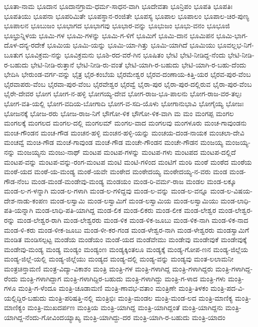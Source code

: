{ಭೂತಾ-ನಾಮ
ಭೂದಾನ
ಭೂದಾನಗ್ರಾಮ-ಧರ್ಮ-ಸಾಧನ-ವಾಗಿ
ಭೂದೇವತಾ
ಭೂನ್ರಿಪಂ
ಭೂಪತಿ
ಭೂಪತಿಃ
ಭೂಪತಿಯು
ಭೂಪನಾ
ಭೂಪರಿಮಿತೇ
ಭೂಪಸ್ಥಾನ-ರಂಜಿತೇ
ಭೂಪಸ್ಯ
ಭೂಪಾಲ
ಭೂಪಾಲಂ
ಭೂಪಾಲ-ಚಿರ-ಪುಣ್ಯ
ಭೂಪಾಲನ
ಭೂಬುಜಂ
ಭೂಭಾಗದ
ಭೂಭಾಗವು
ಭೂಭಾರ-ವನ್ನು
ಭೂಭುಜಂ
ಭೂಭು-ವನಂ
ಭೂಭೂಜಿ
ಭೂಭ್ರುನ್ನಿಳಯ
ಭೂಮಿ-ಗಳ
ಭೂಮಿ-ಗಳನ್ನು
ಭೂಮಿ-ಗ-ಳಿಗೆ
ಭೂಮಿಗೆ
ಭೂಮಿ-ದಾನ
ಭೂಮಿಪನ
ಭೂಮಿ-ಭಾಗ-ದೊಳ-ದನ್ಯ-ರದೇಕೆ
ಭೂಮಿಯ
ಭೂಮಿ-ಯನ್ನು
ಭೂಮಿ-ಯಾ-ಗಿತ್ತು
ಭೂಮಿ-ಯಾಗಿದೆ
ಭೂಮಿಯು
ಭೂವಲ್ಲಭ-ನಿಗೆ-ಬೂತುಗ
ಭೂವಿಕ್ರಮ-ನನ್ನು
ಭೂವಿಕ್ರಮನು
ಭೂಶಿ-ರದ-ವರೆ-ಗಿನ
ಭೂಷಿತಂ
ಭೇಟಿ
ಭೇಟಿ-ನೀಡಿದ್ದ-ನೆಂದು
ಭೇಟಿ-ನೀಡಿ-ರ-ಬಹುದು
ಭೇಟಿ-ನೀಡಿ-ರುತ್ತಾನೆ
ಭೇಟಿ-ನೀಡಿ-ರು-ವಂತೆ
ಭೇಟಿ-ಯಾಗಿ-ರ-ಬಹುದು
ಭೇಟಿ-ಯಾಗಿ-ರ-ಬಹು-ದೆಂದು
ಭೇದಿಸಿ
ಭೇರುಂಡ-ವರ್ಗ-ವನ್ನು
ಭೈತ್ರ
ಭೈರ-ಕಂಬೆಯ
ಭೈರಮೇಶ್ವರ
ಭೈರವ-ದಂಣಾಯ-ಕಿತ್ತಿ-ಯರ
ಭೈರವ-ಪುರ-ವೆಂಬ
ಭೈರವಾಪರು-ವೆಂಬ
ಭೈರವಾ-ಪುರ-ವೆಂಬ
ಭೈರವೇಶ್ವರ
ಭೈರವ್ವೆ
ಭೈರಾ-ಪುರ
ಭೈರಾ-ಪುರ-ದಲ್ಲಿರುವ
ಭೈರಾ-ಪುರ-ವೆಂಬ
ಭೈರೇ-ದೇವರ
ಭೋಗ
ಭೋಗ-ನ-ಹಳ್ಳಿ
ಭೋಗಯ್ಯ-ದೇವ
ಭೋಗ-ರಾಜ-ಭೂ-ಪಾಲನು
ಭೋಗ-ರಾಜ-ವರ-ತಲ್ಪಃ
ಭೋಗ-ವತಿ-ಯಲ್ಲಿ
ಭೋಗ-ವದಿಯ-ಬೋಗಾದಿ
ಭೋಗ-ವ-ಸದಿ-ಯೊಳು
ಭೋಗಾನುಭಾವಿ
ಭೋಗೈಯ್ಯ
ಭೋಜಃ
ಭೋಜನಕ್ಕೆ
ಭೋಜ-ರರು
ಭೋಜ-ರಾಜ-ನಿಗೆ
ಭೌಗೋ-ಳಿಕ
ಭೌಗೋ-ಳಿಕ-ವಾಗಿ
ಮ
ಮಂ
ಮಂಗಪ್ಪ
ಮಂಗಲ
ಮಂಗಲಕ್ಕೆ
ಮಂಗಲದ
ಮಂಗಲ-ದಲ್ಲಿ
ಮಂಗಲಮ್
ಮಂಗಲ-ವಾದ
ಮಂಗಲವು
ಮಂಗಳೂರು
ಮಂಚ-ಗಾವುಂಡನು
ಮಂಚ-ಗೌಂಡನ
ಮಂಚ-ಗೌಡ
ಮಂಚನ-ಹಳ್ಳಿ
ಮಂಚನ-ಹಳ್ಳಿ-ಯನ್ನು
ಮಂಚಯ-ದಂಡ-ನಾಯಕ
ಮಂಚಲಾ-ದೇವಿ
ಮಂಚವ್ವೆ
ಮಂಚಿ-ಗೌಡ
ಮಂಚೆ-ಗಾವುಂಡ
ಮಂಚೆ-ಗೌಡ
ಮಂಚೇ-ಗೌಂಡನ
ಮಂಚೇ-ಗೌಡನ
ಮಂಜಯ್ಯ
ಮಂಜಯ್ಯ-ನನ್ನು
ಮಂಜಯ್ಯನು
ಮಂಜು-ನಾಥ್
ಮಂಟಪ
ಮಂಟಪ-ಗಳನ್ನು
ಮಂಟಪ-ಗಳು
ಮಂಟಪದ
ಮಂಟಪ-ದಲ್ಲಿದೆ
ಮಂಟಪ-ವನ್ನು
ಮಂಟಪ-ವನ್ನು-ರಂಗ-ಮಂಟಪ
ಮಂಟಿ
ಮಂಟಿ-ಗಳಿಂದ
ಮಂಟಿಗೆ
ಮಂಠಿ
ಮಂಠೆ
ಮಂಠೆದ
ಮಂಠೆಯ
ಮಂಠೆ-ಯದ
ಮಂಠೆ-ಯ-ಮಂಡ್ಯ
ಮಂಠೆ-ಯವೇ
ಮಂಠೇದ
ಮಂಠೇದಯ್ಯ
ಮಂಠೇದಯ್ಯ-ನ-ವರು
ಮಂಡ
ಮಂಡ-ಗೌಡ-ನೆಂಬ
ಮಂಡ-ಮಂಡೆ-ಮಂಡೇವು-ಮಂಡ್ಯ
ಮಂಡಯಂ
ಮಂಡ-ರಿ-ವರ್ಮ-ರಾಜ
ಮಂಡಲ
ಮಂಡ-ಲಕ್ಕೂ
ಮಂಡ-ಲ-ಗ-ಳನ್ನಾಗಿ
ಮಂಡ-ಲ-ಗಳಾಗಿ
ಮಂಡ-ಲ-ಗಳಿದ್ದವು
ಮಂಡ-ಲ-ವನ್ನು
ಮಂಡ-ಲ-ವನ್ನೂ
ಮಂಡ-ಲ-ವಿಷಯ-ದೇಶ-ನಾಡು-ಕಂಪಣ
ಮಂಡ-ಲಸ್ವಾಮಿ
ಮಂಡ-ಲಸ್ವಾಮಿಗೆ
ಮಂಡ-ಲಸ್ವಾಮಿಯ
ಮಂಡ-ಲಸ್ವಾಮಿಯು
ಮಂಡ-ಲಾಧಿ-ಪತಿ-ಯನ್ನಾಗಿ
ಮಂಡ-ಲಾಧಿ-ಪತಿ-ಯಾಗಿದ್ದ
ಮಂಡ-ಲಿಕ
ಮಂಡ-ಲಿಕರು
ಮಂಡ-ಲೀಕ
ಮಂಡ-ಲೇಶ್ವರ
ಮಂಡ-ಲೇಶ್ವರ-ರನ್ನು
ಮಂಡ-ಲೇಶ್ವರ-ರಾಗಿ
ಮಂಡ-ಲೇಶ್ವರರು
ಮಂಡ-ಳಿಕ
ಮಂಡ-ಳಿಕ-ಜೂಬು
ಮಂಡ-ಳಿಕ-ನಾಗಿ
ಮಂಡ-ಳಿಕ-ನಾದ
ಮಂಡ-ಳಿ-ಕರು
ಮಂಡ-ಳೀಕ-ಜೂಬು
ಮಂಡ-ಳೀ-ಕರ-ಗಂಡ
ಮಂಡ-ಳೇಶ್ವರ-ನಾಗಿ
ಮಂಡ-ಳೇಶ್ವರರು
ಮಂಡಸ್ವಾಮಿಗೆ
ಮಂಡಿತ
ಮಂಡಿಸಲ್ಪಟ್ಟ
ಮಂಡೆಯ
ಮಂಡೆಯಂ
ಮಂಡೆ-ಯದ
ಮಂಡೆವೇಮು
ಮಂಡೇವು
ಮಂಡೇವುಕೆ
ಮಂಡೇವುಕ್ಕೆ
ಮಂಡೇವು-ಮಂಡ್ಯ
ಮಂಡ್ಯ
ಮಂಡ್ಯಂ
ಮಂಡ್ಯಂಣ
ಮಂಡ್ಯಕ್ಕಿಂತಲೂ
ಮಂಡ್ಯಕ್ಕೆ
ಮಂಡ್ಯ-ಗೋಪ-ಣನ
ಮಂಡ್ಯ-ಜಿಲ್ಲೆಯ
ಮಂಡ್ಯ-ಜಿಲ್ಲೆ-ಯಲ್ಲಿ
ಮಂಡ್ಯ-ಜಿಲ್ಲೆಯು
ಮಂಡ್ಯದ
ಮಂಡ್ಯ-ದಲ್ಲಿ
ಮಂಡ್ಯ-ವನ್ನು
ಮಂಡ್ಯವು
ಮಂತ-ಲಲಾಮನೀ
ಮಂತ್ರಚಿನ್ತಾಮಣಿ
ಮಂತ್ರ-ವಿದ್ಯಾ-ವಿಕಾಶಂ
ಮಂತ್ರಿ
ಮಂತ್ರಿ-ಗಳ
ಮಂತ್ರಿ-ಗಳಾಗಿದ್ದ
ಮಂತ್ರಿ-ಗಳಾಗಿದ್ದರು
ಮಂತ್ರಿ-ಗಳಾಗಿದ್ದ-ರೆಂದು
ಮಂತ್ರಿ-ಗಳಾಗಿದ್ದಾಗ
ಮಂತ್ರಿ-ಗಳಾಗಿದ್ದಿರ-ಬಹುದು
ಮಂತ್ರಿ-ಗಳಾಗಿದ್ದು
ಮಂತ್ರಿ-ಗ-ಳಾದ
ಮಂತ್ರಿ-ಗಳು
ಮಂತ್ರಿ-ಗಳೂ
ಮಂತ್ರಿ-ಗ-ಳೆಂದೂ
ಮಂತ್ರಿ-ಚೂಡಾಮಣಿ
ಮಂತ್ರಿ-ಣಾವಭ-ವತಾಂ
ಮಂತ್ರಿಣೇ
ಮಂತ್ರಿ-ತಿಳಕಂ
ಮಂತ್ರಿ-ಪದ-ವಿ-ಯಲ್ಲಿದ್ದಿರ-ಬಹುದು
ಮಂತ್ರಿ-ಪರಿಷತ್ತಿ-ನಲ್ಲಿ
ಮಂತ್ರಿಭಿಃ
ಮಂತ್ರಿ-ಮಂಡಲ
ಮಂತ್ರಿ-ಮಂಡ-ಲದ
ಮಂತ್ರಿ-ಮಾಣಿಕ್ಯ
ಮಂತ್ರಿ-ಮಾಣಿಕ್ಯಂ
ಮಂತ್ರಿ-ಮುಖದರ್ಪಣ
ಮಂತ್ರಿಯ
ಮಂತ್ರಿ-ಯಾಗಿದ್ದ
ಮಂತ್ರಿ-ಯಾಗಿದ್ದಂತೆ
ಮಂತ್ರಿ-ಯಾಗಿದ್ದನು
ಮಂತ್ರಿ-ಯಾಗಿದ್ದ-ನೆಂದು-ಗೋವಿಂದಯ್ಯಾಖ್ಯ
ಮಂತ್ರಿ-ಯಾಗಿದ್ದು-ದರ
ಮಂತ್ರಿ-ಯಾಗಿ-ರ-ಬಹುದು
ಮಂತ್ರಿ-ಯಾದಂ
}
